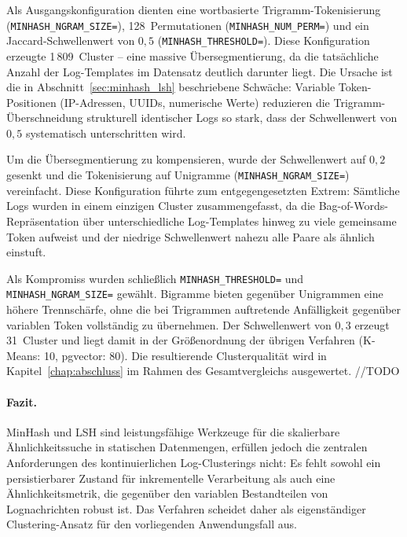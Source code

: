 Als Ausgangskonfiguration dienten eine wortbasierte Trigramm-Tokenisierung
(\texttt{MINHASH\_NGRAM\_SIZE\;=}), 128~Permutationen
(\texttt{MINHASH\_NUM\_PERM\;=}) und ein Jaccard-Schwellenwert von $0{,}5$
(\texttt{MINHASH\_THRESHOLD\;=}). Diese Konfiguration erzeugte
1\,809~Cluster -- eine massive Übersegmentierung, da die tatsächliche Anzahl
der Log-Templates im Datensatz deutlich darunter liegt. Die Ursache ist die in
Abschnitt~\ref{sec:minhash_lsh} beschriebene Schwäche: Variable Token-Positionen
(IP-Adressen, UUIDs, numerische Werte) reduzieren die Trigramm-Überschneidung
strukturell identischer Logs so stark, dass der Schwellenwert von $0{,}5$
systematisch unterschritten wird.

Um die Übersegmentierung zu kompensieren, wurde der Schwellenwert auf $0{,}2$
gesenkt und die Tokenisierung auf Unigramme (\texttt{MINHASH\_NGRAM\_SIZE\;=})
vereinfacht. Diese Konfiguration führte zum entgegengesetzten Extrem: Sämtliche
Logs wurden in einem einzigen Cluster zusammengefasst, da die
Bag-of-Words-Repräsentation über unterschiedliche Log-Templates hinweg zu viele
gemeinsame Token aufweist und der niedrige Schwellenwert nahezu alle Paare als
ähnlich einstuft.

Als Kompromiss wurden schließlich \texttt{MINHASH\_THRESHOLD\;=} und
\texttt{MINHASH\_NGRAM\_SIZE\;=} gewählt. Bigramme bieten gegenüber
Unigrammen eine höhere Trennschärfe, ohne die bei Trigrammen auftretende
Anfälligkeit gegenüber variablen Token vollständig zu übernehmen. Der
Schwellenwert von $0{,}3$ erzeugt 31~Cluster und liegt damit in der
Größenordnung der übrigen Verfahren (K-Means: 10, pgvector: 80). Die
resultierende Clusterqualität wird in Kapitel~\ref{chap:abschluss} im
Rahmen des Gesamtvergleichs ausgewertet. //TODO

\paragraph{Fazit.}
MinHash und LSH sind leistungsfähige Werkzeuge für die skalierbare
Ähnlichkeitssuche in statischen Datenmengen, erfüllen jedoch die zentralen
Anforderungen des kontinuierlichen Log-Clusterings nicht: Es fehlt sowohl ein
persistierbarer Zustand für inkrementelle Verarbeitung als auch eine
Ähnlichkeitsmetrik, die gegenüber den variablen Bestandteilen von Lognachrichten
robust ist. Das Verfahren scheidet daher als eigenständiger Clustering-Ansatz
für den vorliegenden Anwendungsfall aus.
